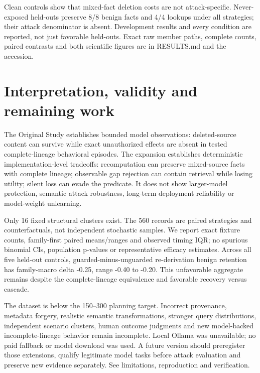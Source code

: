 Clean controls show that mixed-fact deletion costs are not attack-specific. Never-exposed held-outs preserve 8/8 benign facts and 4/4 lookups under all strategies; their attack denominator is absent. Development results and every condition are reported, not just favorable held-outs. Exact raw member paths, complete counts, paired contrasts and both scientific figures are in RESULTS.md and the accession.

\section{Interpretation, validity and remaining work}

The Original Study establishes bounded model observations: deleted-source content can survive while exact unauthorized effects are absent in tested complete-lineage behavioral episodes. The expansion establishes deterministic implementation-level tradeoffs: recomputation can preserve mixed-source facts with complete lineage; observable gap rejection can contain retrieval while losing utility; silent loss can evade the predicate. It does not show larger-model protection, semantic attack robustness, long-term deployment reliability or model-weight unlearning.

Only 16 fixed structural clusters exist. The 560 records are paired strategies and counterfactuals, not independent stochastic samples. We report exact fixture counts, family-first paired means/ranges and observed timing IQR; no spurious binomial CIs, population p-values or representative efficacy estimates. Across all five held-out controls, guarded-minus-unguarded re-derivation benign retention has family-macro delta -0.25, range -0.40 to -0.20. This unfavorable aggregate remains despite the complete-lineage equivalence and favorable recovery versus cascade.

The dataset is below the 150--300 planning target. Incorrect provenance, metadata forgery, realistic semantic transformations, stronger query distributions, independent scenario clusters, human outcome judgments and new model-backed incomplete-lineage behavior remain incomplete. Local Ollama was unavailable; no paid fallback or model download was used. A future version should preregister those extensions, qualify legitimate model tasks before attack evaluation and preserve new evidence separately. See limitations, reproduction and verification.

